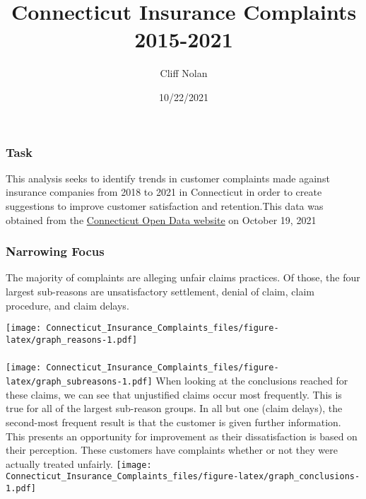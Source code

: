 \documentclass[
]{article}
\title{Connecticut Insurance Complaints 2015-2021}
\author{Cliff Nolan}
\date{10/22/2021}
\begin{document}
\maketitle

\hypertarget{task}{%
\subsubsection{Task}\label{task}}

This analysis seeks to identify trends in customer complaints made
against insurance companies from 2018 to 2021 in Connecticut in order to
create suggestions to improve customer satisfaction and retention.This
data was obtained from the
\href{https://data.ct.gov/Business/Insurance-Company-Complaints-Resolutions-Status-an/t64r-mt64}{Connecticut
Open Data website} on October 19, 2021

\hypertarget{narrowing-focus}{%
\subsubsection{Narrowing Focus}\label{narrowing-focus}}

The majority of complaints are alleging unfair claims practices. Of
those, the four largest sub-reasons are unsatisfactory settlement,
denial of claim, claim procedure, and claim delays.

\texttt{[image: Connecticut\_Insurance\_Complaints\_files/figure-latex/graph\_reasons-1.pdf]}

\hypertarget{section}{%
\subsubsection{}\label{section}}

\texttt{[image: Connecticut\_Insurance\_Complaints\_files/figure-latex/graph\_subreasons-1.pdf]}
When looking at the conclusions reached for these claims, we can see
that unjustified claims occur most frequently. This is true for all of
the largest sub-reason groups. In all but one (claim delays), the
second-most frequent result is that the customer is given further
information. This presents an opportunity for improvement as their
dissatisfaction is based on their perception. These customers have
complaints whether or not they were actually treated unfairly.
\texttt{[image: Connecticut\_Insurance\_Complaints\_files/figure-latex/graph\_conclusions-1.pdf]}
\end{document}
